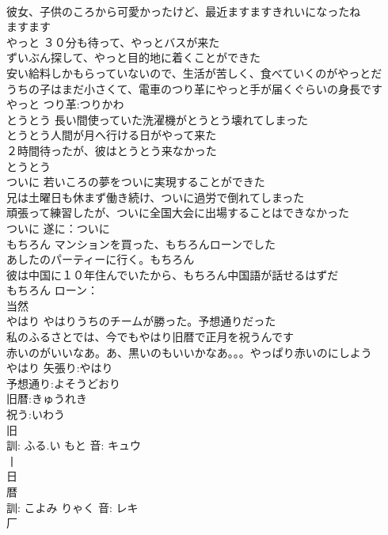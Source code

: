 \documentclass[8pt]{extreport}
\begin{document}
\begin{CJK}{UTF8}{min}
\\	彼女、子供のころから可愛かったけど、最近ますますきれいになったね 
\\	ますます						
\\	やっと	３０分も待って、やっとバスが来た 
\\	ずいぶん探して、やっと目的地に着くことができた 
\\	安い給料しかもらっていないので、生活が苦しく、食べていくのがやっとだ 
\\	うちの子はまだ小さくて、電車のつり革にやっと手が届くぐらいの身長です 
\\	やっと			つり革:つりかわ
\\	とうとう	長い間使っていた洗濯機がとうとう壊れてしまった 
\\	とうとう人間が月へ行ける日がやって来た 
\\	２時間待ったが、彼はとうとう来なかった 
\\	とうとう						
\\	ついに	若いころの夢をついに実現することができた 
\\	兄は土曜日も休まず働き続け、ついに過労で倒れてしまった 
\\	頑張って練習したが、ついに全国大会に出場することはできなかった 
\\	ついに			遂に：ついに
\\	もちろん	マンションを買った、もちろんローンでした 
\\	あしたのパーティーに行く。もちろん 
\\	彼は中国に１０年住んでいたから、もちろん中国語が話せるはずだ 
\\	もちろん			ローン：
\\	当然 
\\	やはり	やはりうちのチームが勝った。予想通りだった 
\\	私のふるさとでは、今でもやはり旧暦で正月を祝うんです 
\\	赤いのがいいなあ。あ、黒いのもいいかなあ。。。やっぱり赤いのにしよう 
\\	やはり			矢張り:やはり
\\	予想通り:よそうどおり
\\	旧暦:きゅうれき
\\	祝う:いわう
\\	旧 
\\	訓: ふる.い もと 音: キュウ 
\\	丨 
\\	日 
\\	暦 
\\	訓: こよみ りゃく 音: レキ 
\\	厂 

\end{CJK}
\end{document}
